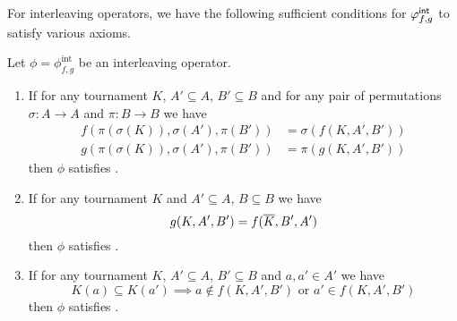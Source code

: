 For interleaving operators, we have the following sufficient conditions for
${\varphi_{f, g}^\mathsf{int}}$ to satisfy various axioms.

\begin{lemma}
   \label{tourn_result_interleaving_suffconditions}

   Let $\phi = \phi_{f,g}^{\text{int}}$ be an interleaving operator.

   \begin{enumerate}
       \item \label{tourn_item_int_lemma_anon}

        If for any tournament $K$, $A' \subseteq A$, $B' \subseteq B$ and for
        any pair of permutations $\sigma: A \to A$ and $\pi: B \to B$ we have
        \begin{align*}
            f(\pi(\sigma(K)), \sigma(A'), \pi(B')) &= \sigma(f(K, A', B')) \\
            g(\pi(\sigma(K)), \sigma(A'), \pi(B')) &= \pi(g(K, A', B'))
        \end{align*}
           then $\phi$ satisfies \anon{}.

   \item \label{tourn_item_int_lemma_dual}

        If for any tournament $K$ and $A' \subseteq A$, $B \subseteq B$ we have
        \[ g(K, A', B') = f({\overline{K}}, B', A') \] then $\phi$ satisfies
           \dualaxiom{}.

   \item \label{tourn_item_int_lemma_mon}

        If for any tournament $K$, $A' \subseteq A$, $B' \subseteq B$ and $a,
        a' \in A'$ we have
        \[
            K(a) \subseteq K(a')
            \implies
            a \not\in f(K, A', B') \text{ or } a' \in f(K, A', B')
        \]
           then $\phi$ satisfies \mon{}.

    \end{enumerate}

\end{lemma}

